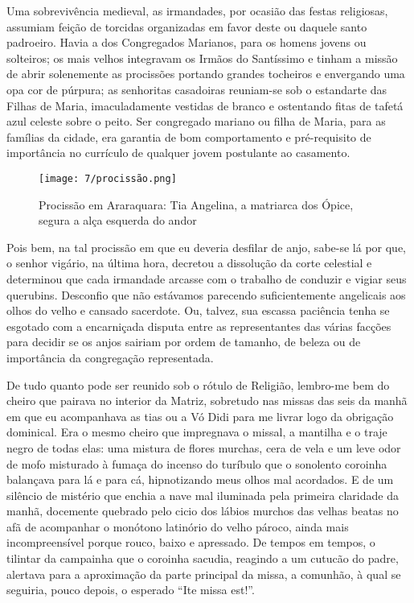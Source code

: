 Uma sobrevivência medieval, as irmandades, por ocasião das festas religiosas, assumiam feição de torcidas organizadas em favor deste ou daquele santo padroeiro. Havia a dos Congregados Marianos, para os homens jovens ou solteiros; os mais velhos integravam os Irmãos do Santíssimo e tinham a missão de abrir solenemente as procissões portando grandes tocheiros e envergando uma opa cor de púrpura; as senhoritas casadoiras reuniam-se sob o estandarte das Filhas de Maria, imaculadamente vestidas de branco e ostentando fitas de tafetá azul celeste sobre o peito. 
Ser congregado mariano ou filha de Maria, para as famílias da cidade, era garantia de bom comportamento e pré-requisito de importância no currículo de qualquer jovem postulante ao casamento. 

\begin{figure}[H]
\centering
\texttt{[image: 7/procissão.png]}
\caption{Procissão em Araraquara: Tia Angelina, a matriarca dos Ópice, segura a alça esquerda do andor}
\end{figure}

Pois bem, na tal procissão em que eu deveria desfilar de anjo, sabe-se lá por que, o senhor vigário, na última hora, decretou a dissolução da corte celestial e determinou que cada irmandade arcasse com o trabalho de conduzir e vigiar seus querubins. 
Desconfio que não estávamos parecendo suficientemente angelicais aos olhos do velho e cansado sacerdote. 
Ou, talvez, sua escassa paciência tenha se esgotado com a encarniçada disputa entre as representantes das várias facções para decidir se os anjos sairiam por ordem de tamanho, de beleza ou de importância da congregação representada. 

De tudo quanto pode ser reunido sob o rótulo de Religião, lembro-me bem do cheiro que pairava no interior da Matriz, sobretudo nas missas das seis da manhã em que eu acompanhava as tias ou a Vó Didi para me livrar logo da obrigação dominical. 
Era o mesmo cheiro que impregnava o missal, a mantilha e o traje negro de todas elas: uma mistura de flores murchas, cera de vela e um leve odor de mofo misturado à fumaça do incenso do turíbulo que o sonolento coroinha balançava para lá e para cá, hipnotizando meus olhos mal acordados.  
E de um silêncio de mistério que enchia a nave mal iluminada pela primeira claridade da manhã, docemente quebrado pelo cicio dos lábios murchos das velhas beatas no afã de acompanhar o monótono latinório do velho pároco, ainda mais incompreensível porque rouco, baixo e apressado. 
De tempos em tempos, o tilintar da campainha que o coroinha sacudia, reagindo a um cutucão do padre, alertava para a aproximação da parte principal da missa, a comunhão, à qual se seguiria, pouco depois, o esperado “Ite missa est!”.

